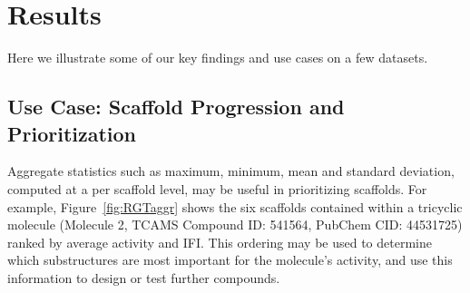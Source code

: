 \documentclass[journal=jacsat,biochem,manuscript=article]{achemso}
\newcommand*\fref[1]{Figure~\ref{fig:#1}}
\newcommand*\ie{i.e.,~}
\begin{document}



\section{Results}
\label{sec:results}
Here we illustrate some of our key findings and use cases on a few datasets. 

\subsection{Use Case: Scaffold Progression and Prioritization}
Aggregate statistics such as maximum, minimum, mean and standard
deviation, computed at a per scaffold level, may be useful in
prioritizing scaffolds. For example, \fref{RGTaggr} shows the six
scaffolds contained within a tricyclic molecule (Molecule
2, TCAMS Compound ID: 541564, PubChem CID: 44531725)
ranked by average activity and IFI. This ordering may
be used to determine which substructures are most important for the
molecule's activity, and use this information to design or test
further compounds.
\end{document}

